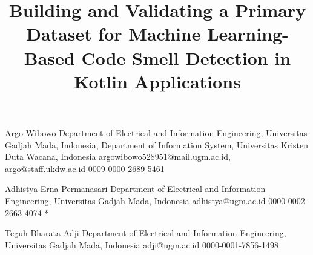 \documentclass[]{einformatica}
\begin{document}
	
	\title{Building and Validating a Primary Dataset for Machine Learning-Based Code Smell Detection in Kotlin Applications}
	
	
	
	
	\EIauthorI
	{Argo}
	{Wibowo}
	{Department of Electrical and Information Engineering, Universitas Gadjah Mada, Indonesia, Department of Information System, Universitas Kristen Duta Wacana, Indonesia}
	{argowibowo528951@mail.ugm.ac.id, argo@staff.ukdw.ac.id}
	{0009-0000-2689-5461} %
	{} %
	
	\EIauthorII
	{Adhistya}
	{Erna Permanasari}
	{Department of Electrical and Information Engineering, Universitas Gadjah Mada, Indonesia}
	{adhistya@ugm.ac.id}
	{0000-0002-2663-4074}
	{*} %
	
	\EIauthorIII
	{Teguh}
	{Bharata Adji}
	{Department of Electrical and Information Engineering, Universitas Gadjah Mada, Indonesia}
	{adji@ugm.ac.id}
	{0000-0001-7856-1498}
	{} %
	
	
\end{document}
